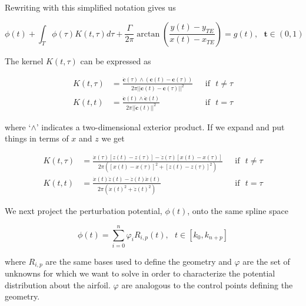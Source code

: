	\noindent Rewriting with this simplified notation gives us
	
	\begin{equation}
	\label{eqn:discreteformulation}
	\phi(t) + \int_{T} \phi(\tau) K(t,\tau) d\tau + \frac{\Gamma}{2\pi} \arctan\left( \frac{y(t) - y_{TE}}{x(t)-x_{TE}} \right) = g(t), ~~~\mathbf{t} \in (0,1)
	\end{equation}
	
	\noindent The kernel $K(t,\tau)$ can be expressed as
	
	\begin{equation}
	\begin{aligned}
	K(t,\tau) &= \frac{ \dot{\mathbf{c}}(\tau) \wedge \left( \mathbf{c}(t) - \mathbf{c}(\tau) \right) }{2\pi||\mathbf{c}(t)-\mathbf{c}(\tau)||^2} &~~~\mathrm{if}~~~ t\neq\tau\\
	K(t,t) &= \frac{\dot{\mathbf{c}}(t)\wedge\ddot{\mathbf{c}}(t) }{2\pi||\dot{\mathbf{c}}(t)||^2} &~~~\mathrm{if}~~~  t=\tau
	\end{aligned}
	\end{equation}
	
	\noindent where `$\wedge$' indicates a two-dimensional exterior product. If we expand and put things in terms of $x$ and $z$ we get
	
	\begin{equation}
	\begin{aligned}
	K(t,\tau) &= \frac{ \dot{x}(\tau) \left[ z(t) - z(\tau) \right] - \dot{z}(\tau) \left[ x(t) - x(\tau) \right] }{2\pi\left( \left[ x(t) - x(\tau) \right]^2 + \left[ z(t) - z(\tau) \right]^2 \right)}  &~~~\mathrm{if}~~~ t\neq\tau\\
	K(t,t) &= \frac{ \dot{x}(t)\ddot{z}(t) - \dot{z}(t)\ddot{x}(t) }{2\pi\left( \dot{x}(t)^2  + \dot{z}(t)^2 \right)} &~~~\mathrm{if}~~~  t=\tau
	\end{aligned}
	\end{equation}
	
	We next project the perturbation potential, \( \phi(t) \), onto the same spline space 
	
	\begin{equation}
	\label{eqn:projection}
	\phi(t) = \sum_{i=0}^{n}\varphi_i R_{i,p}(t),~~~t \in [k_0,k_{n+p}]
	\end{equation}
	
	\noindent where \(R_{i,p}\) are the same bases used to define the geometry and \(\varphi\) are the set of unknowns for which we want to solve in order to characterize the potential distribution about the airfoil. $\varphi$ are analogous to the control points defining the geometry. 
	
